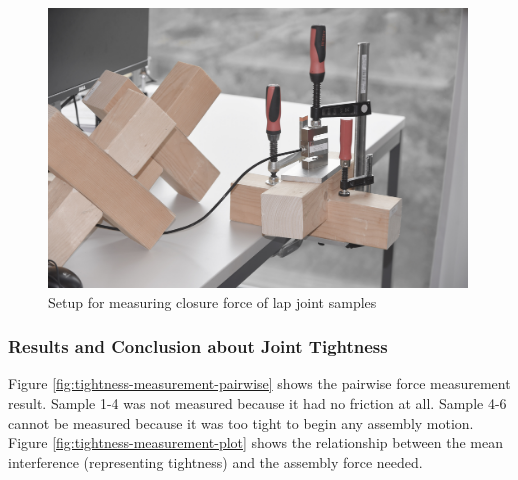 \begin{figure}
    \centering
    \includegraphics[width=0.99\textwidth]{images/04-1+2/setup.jpg}
    \caption{Setup for measuring closure force of lap joint samples}
    \label{fig:interference-measurement-setup}
\end{figure}

\subsubsection{Results and Conclusion about Joint Tightness}

Figure \ref{fig:tightness-measurement-pairwise} shows the pairwise force measurement result. Sample 1-4 was not measured because it had no friction at all. Sample 4-6 cannot be measured because it was too tight to begin any assembly motion. Figure \ref{fig:tightness-measurement-plot} shows the relationship between the mean interference (representing tightness) and the assembly force needed.

